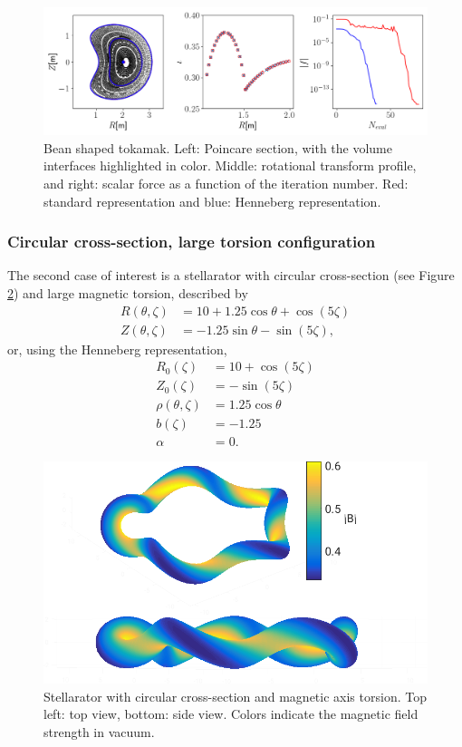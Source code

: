 \documentclass[my_thesis.tex]{subfiles}
\begin{document}
\begin{figure}
	\centering
	\includegraphics[width=\linewidth]{images/HennebergRepresentation/BeanShape.png}
	\caption{Bean shaped tokamak. Left: Poincare section, with the volume interfaces highlighted in color. Middle: rotational transform profile, and right: scalar force as a function of the iteration number. Red: standard representation and blue: Henneberg representation.}
	\label{fig. bean shape henneberg representation}
\end{figure}



\subsubsection{Circular cross-section, large torsion configuration}
The second case of interest is a stellarator with circular cross-section (see Figure \ref{fig. circular stellarator geometry}) and large magnetic torsion, described by
\begin{align}
	R(\theta,\zeta) &= 10 + 1.25\cos\theta + \cos(5\zeta)\\
	Z(\theta,\zeta) &= -1.25\sin\theta - \sin(5\zeta), 
\end{align}
or, using the Henneberg representation,
\begin{align}
    R_0(\zeta) &= 10 + \cos(5\zeta)\\
	Z_0(\zeta) &= -\sin(5\zeta)\\
	\rho(\theta,\zeta) &= 1.25\cos\theta\\
	b(\zeta) &= -1.25\\
	\alpha &= 0.
\end{align}
\begin{figure}
	\centering
	\includegraphics[width=.8\linewidth]{images/HennebergRepresentation/CircularTorsion_modB_boundary.png}
	\caption{Stellarator with circular cross-section and magnetic axis torsion. Top left: top view, bottom: side view. Colors indicate the magnetic field strength in vacuum.}
	\label{fig. circular stellarator geometry}
\end{figure}
\end{document}
